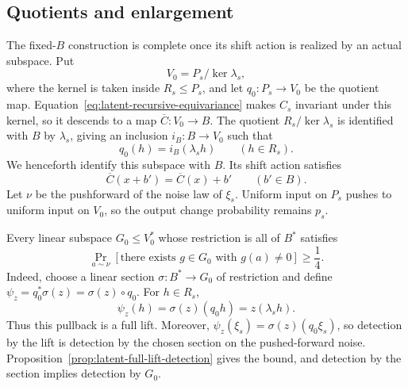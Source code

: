 \subsection{Quotients and enlargement}

The fixed-$B$ construction is complete once its shift action is realized
by an actual subspace.  Put
\[
 V_0=P_s/\ker\lambda_s,
\]
where the kernel is taken inside $R_s\le P_s$, and let
$q_0:P_s\to V_0$ be the quotient map.
Equation~\eqref{eq:latent-recursive-equivariance} makes $C_s$ invariant under
this kernel, so it descends to a map $\overline C:V_0\to B$.
The quotient $R_s/\ker\lambda_s$ is identified with $B$ by $\lambda_s$,
giving an inclusion $i_B:B\to V_0$ such that
\[
 q_0(h)=i_B(\lambda_s h)\qquad(h\in R_s).
\]
We henceforth identify this subspace with $B$.  Its shift action satisfies
\[
 \overline C(x+b')=\overline C(x)+b'
 \qquad(b'\in B).
\]
Let $\nu$ be the pushforward of the noise law of $\xi_s$.
Uniform input on $P_s$ pushes to uniform input on $V_0$, so the output
change probability remains $p_s$.

Every linear subspace $G_0\le V_0^*$ whose restriction is all of $B^*$
satisfies
\begin{equation}\label{eq:latent-base-detection}
 \Pr_{a\sim\nu}[\text{there exists }g\in G_0\text{ with }g(a)\ne0]
 \ge\frac14.
\end{equation}
Indeed, choose a linear section $\sigma:B^*\to G_0$ of restriction and
define $\psi_z=q_0^*\sigma(z)=\sigma(z)\circ q_0$.  For $h\in R_s$,
\[
 \psi_z(h)=\sigma(z)(q_0h)=z(\lambda_s h).
\]
Thus this pullback is a full lift.  Moreover,
$\psi_z(\xi_s)=\sigma(z)(q_0\xi_s)$, so detection by the lift is detection
by the chosen section on the pushed-forward noise.
Proposition~\ref{prop:latent-full-lift-detection} gives the bound, and
detection by the section implies detection by $G_0$.

